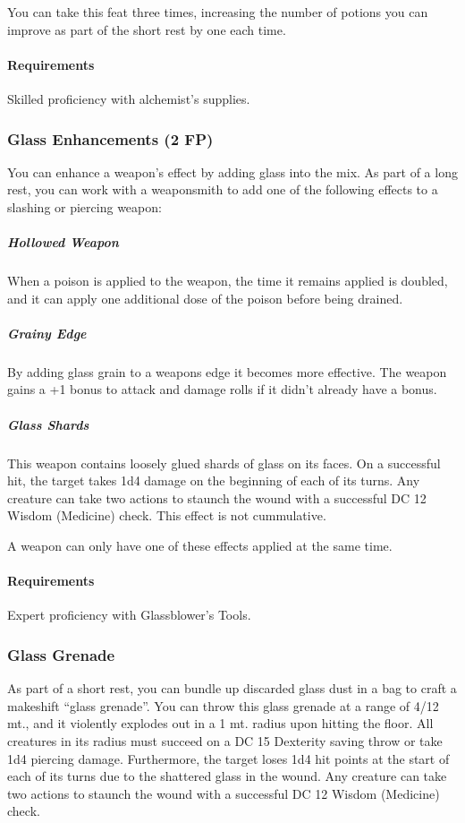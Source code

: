     You can take this feat three times, increasing the number of potions you can improve as part of the short rest by one each time.
    \paragraph{Requirements} Skilled proficiency with alchemist's supplies.
\subsubsection{Glass Enhancements (2 FP)} \label{feat::glassenhancement}
    You can enhance a weapon's effect by adding glass into the mix.
    As part of a long rest, you can work with a weaponsmith to add one of the following effects to a slashing or piercing weapon:
    \subparagraph{Hollowed Weapon} When a poison is applied to the weapon, the time it remains applied is doubled, and it can apply one additional dose of the poison before being drained.
    \subparagraph{Grainy Edge} By adding glass grain to a weapons edge it becomes more effective.
    The weapon gains a +1 bonus to attack and damage rolls if it didn't already have a bonus.
    \subparagraph{Glass Shards} This weapon contains loosely glued shards of glass on its faces.
    On a successful hit, the target takes 1d4 damage on the beginning of each of its turns.
    Any creature can take two actions to staunch the wound with a successful DC 12 Wisdom (Medicine) check.
    This effect is not cummulative.

    A weapon can only have one of these effects applied at the same time.
    \paragraph{Requirements} Expert proficiency with Glassblower's Tools.
\subsubsection{Glass Grenade} \label{feat::glassgrenade}
    As part of a short rest, you can bundle up discarded glass dust in a bag to craft a makeshift ``glass grenade''.
    You can throw this glass grenade at a range of 4/12 mt., and it violently explodes out in a 1 mt. radius upon hitting the floor.
    All creatures in its radius must succeed on a DC 15 Dexterity saving throw or take 1d4 piercing damage.
    Furthermore, the target loses 1d4 hit points at the start of each of its turns due to the shattered glass in the wound.
    Any creature can take two actions to staunch the wound with a successful DC 12 Wisdom (Medicine) check.

